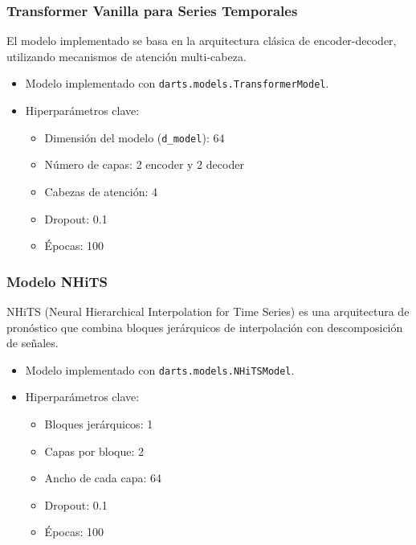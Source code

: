 \documentclass[12pt]{article}
\begin{document}
\subsubsection{Transformer Vanilla para Series Temporales}

El modelo implementado se basa en la arquitectura clásica de encoder-decoder, utilizando mecanismos de atención multi-cabeza.

\begin{itemize}
\item Modelo implementado con \texttt{darts.models.TransformerModel}.
\item Hiperparámetros clave:
\begin{itemize}
\item Dimensión del modelo (\texttt{d\_model}): 64 %
\item Número de capas: 2 encoder y 2 decoder
\item Cabezas de atención: 4
\item Dropout: 0.1
\item Épocas: 100
\end{itemize}
\end{itemize}


\subsubsection{Modelo NHiTS}

NHiTS (Neural Hierarchical Interpolation for Time Series) es una arquitectura de pronóstico que combina bloques jerárquicos de interpolación con descomposición de señales.

\begin{itemize}
\item Modelo implementado con \texttt{darts.models.NHiTSModel}.
\item Hiperparámetros clave:
\begin{itemize}
\item Bloques jerárquicos: 1 %
\item Capas por bloque: 2
\item Ancho de cada capa: 64
\item Dropout: 0.1
\item Épocas:  100
\end{itemize}
\end{itemize}

\end{document}

